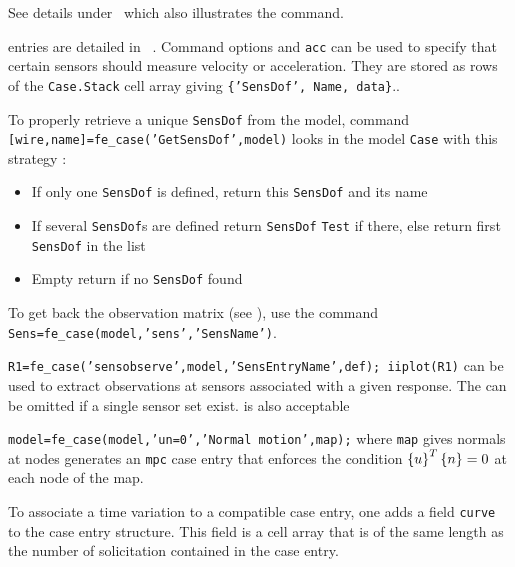 
See details under \rigid\ which also illustrates the  command.


 entries are detailed in ~. Command options  and {\tt acc} can be used to specify that certain sensors should measure velocity or acceleration. They are stored as rows of the {\tt Case.Stack} cell array giving {\tt \{'SensDof', Name, data\}}.. 

To properly retrieve a unique {\tt SensDof} from the model, command {\tt [wire,name]=fe\_case('GetSensDof',model)} looks in the model {\tt Case} with this strategy :
\begin{itemize}
\item If only one {\tt SensDof} is defined, return this {\tt SensDof} and its name
\item If several {\tt SensDof}s are defined return {\tt SensDof} {\tt Test} if there, else return first {\tt SensDof} in the list
\item Empty return if no {\tt SensDof} found
\end{itemize}

To get back the observation matrix (see ), use the command {\tt Sens=fe\_case(model,'sens','SensName')}.

{\tt R1=fe\_case('sensobserve',model,'SensEntryName',def); iiplot(R1)} can be used to extract observations at sensors associated with a given response. The  can be omitted if a single sensor set exist.  is also acceptable 


{\tt model=fe\_case(model,'un=0','Normal motion',map);} where {\tt map} gives normals at nodes generates an {\tt mpc} case entry that enforces the condition $\left\{u\right\}^T\left\{n\right\}=0$ at each node of the map.



To associate a time variation to a compatible case entry, one adds a field {\tt curve} to the case entry structure. This field is a cell array that is of the same length as the number of solicitation contained in the case entry. 

